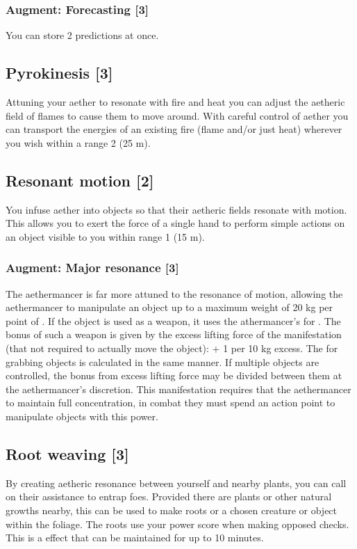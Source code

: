 \subsubsection{Augment: Forecasting [3]}
You can store 2 predictions at once.


\subsection{Pyrokinesis [3]}
Attuning your aether to resonate with fire and heat you can adjust the aetheric field of flames to cause them to move around.  With careful control of aether you can transport the energies of an existing fire (flame and/or just heat) wherever you wish within a range 2 (25 m). 


\subsection{Resonant motion [2]}
\label{spell:min-tele}
You infuse aether into objects so that their aetheric fields resonate with motion. This allows you to exert the force of a single hand to perform simple actions on an object visible to you within range 1 (15 m).
\subsubsection{Augment: Major resonance [3]}
The aethermancer is far more attuned to the resonance of motion, allowing the aethermancer to manipulate an object up to a maximum weight of 20 kg per point of . If the object is used as a weapon, it uses the athermancer's  for . The bonus  of such a weapon is given by the excess lifting force of the manifestation (that not required to actually move the object):  + 1 per 10 kg excess. The  for grabbing objects is calculated in the same manner. If multiple objects are controlled, the  bonus from excess lifting force may be divided between them at the aethermancer's discretion. This manifestation requires that the aethermancer to maintain full concentration, in combat they must spend an action point to manipulate objects with this power.


\subsection{Root weaving [3]}
By creating aetheric resonance between yourself and nearby plants, you can call on their assistance to entrap foes. Provided there are plants or other natural growths nearby, this can be used to make roots  or  a chosen creature or object within the foliage. The roots use your  power score when making opposed checks. This is a  effect that can be maintained for up to 10 minutes.
